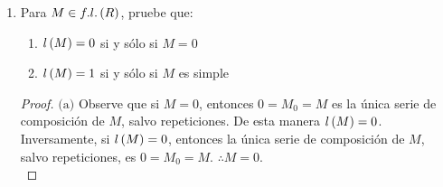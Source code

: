 \documentclass{article}
\begin{document}
\begin{enumerate}[label=\textbf{Ej \arabic*.}]
\begin{proof}
\begin{align*}
	\end{align*}. Así $f:N\to M\in Mod\lrprth{R}$ y, si $j\in I$,
\begin{align*}
	\pi_j\circ f&=\pi_j\lrprth{\sum_{i=1}^n\mu_i\eta_i}=\lrprth{\sum_{i=1}^n\lrprth{\pi_j\mu_i}\eta_i}=\sum_{i=1}^n\delta_{ji}\eta_i=\eta_j.\\
	&\implies\pi_j f=\eta_j\ \forall\ j\in I.
\end{align*}
Finalmente, sea $g:N\to M\in Mod\lrprth{R}$ tal que $\pi_i g=\eta_i\ \forall\ i\in I$. Así
\begin{align*}
	g&=Id_M g=\lrprth{\sum_{i=1}^n{\mu_i\pi_i}}g=\lrprth{\sum_{i=1}^n\mu_i\lrprth{\pi_i g}}=\lrprth{\sum_{i=1}^n\mu_i\eta_i}=f.\\
	&\implies g=f.
\end{align*}
	\end{proof}
\item %
Para $M \in f.l.\left(R\right)$, pruebe que:
\begin{enumerate}
	\item $l\left(M\right)=0$ si y sólo si $M=0$
	\item $l\left(M\right)=1$ si y sólo si $M$ es simple
\end{enumerate}
\begin{proof}
	$\boxed{\text{(a)}}$ Observe que si $M=0$, entonces $0=M_{0}=M$ es la única serie de composición de $M$, salvo repeticiones. De esta manera $l\left(M\right)=0$. Inversamente, si $l\left(M\right)=0$, entonces la única serie de composición de $M$, salvo repeticiones, es $0=M_{0}=M$. $\therefore M=0$.\\
	

\end{proof}
\end{enumerate}
\end{document}
